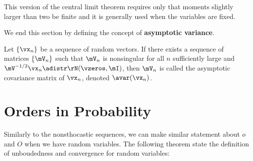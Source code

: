 \documentclass[english,12pt]{book}\usepackage[]{graphicx}\usepackage[]{xcolor}
\begin{document}
This version of the central limit theorem requires only that moments slightly larger than two be finite and it is generally used when the variables are fixed. 

We end this section by defining the concept of \textbf{asymptotic variance}.


\begin{definition}\label{def:asymptotic_variance}
Let $\left\lbrace\vx_n\right\rbrace$ be a sequence of random vectors. If there exists a sequence of matrices $\left\lbrace \mV_n\right\rbrace$ such that $\mV_n$ is nonsingular for all $n$ sufficiently large and $\mV^
{-1/2}\vx_n \adistr \rN(\vzeros, \mI)$, then $\mV_n$ is called the asymptotic covariance matrix of $\vx_n$, denoted $\avar(\vx_n)$.
\end{definition}

\section{Orders in Probability}

Similarly to the nonsthocastic sequences, we can make similar statement about $o$ and $O$ when we have random variables. The following theorem state the definition of unboudedness and convergence for random variables:
\end{document}
